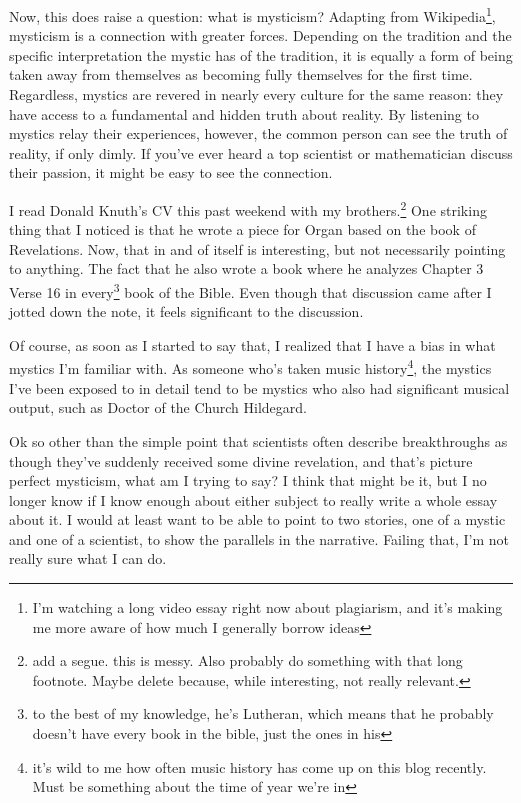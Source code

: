 \documentclass[12pt]{article}[titlepage]
\renewcommand{\,}{\textsuperscript{,}}
\begin{document}
Now, this does raise a question: what is mysticism?
Adapting from Wikipedia\footnote{I'm watching a long video essay right now about plagiarism, and it's making me more aware of how much I generally borrow ideas}, mysticism is a connection with greater forces.
Depending on the tradition and the specific interpretation the mystic has of the tradition, it is equally a form of being taken away from themselves as becoming fully themselves for the first time.
Regardless, mystics are revered in nearly every culture for the same reason: they have access to a fundamental and hidden truth about reality.
By listening to mystics relay their experiences, however, the common person can see the truth of reality, if only dimly.
If you've ever heard a top scientist or mathematician discuss their passion, it might be easy to see the connection.

I read Donald Knuth's CV this past weekend with my brothers.\footnote{add a segue. this is messy. Also probably do something with that long footnote. Maybe delete because, while interesting, not really relevant.}
One striking thing that I noticed is that he wrote a piece for Organ based on the book of Revelations.
Now, that in and of itself is interesting, but not necessarily pointing to anything.
The fact that he also wrote a book where he analyzes Chapter 3 Verse 16 in every\footnote{to the best of my knowledge, he's Lutheran, which means that he probably doesn't have every book in the bible, just the ones in his} book of the Bible.
Even though that discussion came after I jotted down the note, it feels significant to the discussion.

Of course, as soon as I started to say that, I realized that I have a bias in what mystics I'm familiar with.
As someone who's taken music history\footnote{it's wild to me how often music history has come up on this blog recently. Must be something about the time of year we're in}, the mystics I've been exposed to in detail tend to be mystics who also had significant musical output, such as Doctor of the Church Hildegard.

Ok so other than the simple point that scientists often describe breakthroughs as though they've suddenly received some divine revelation, and that's picture perfect mysticism, what am I trying to say?
I think that might be it, but I no longer know if I know enough about either subject to really write a whole essay about it.
I would at least want to be able to point to two stories, one of a mystic and one of a scientist, to show the parallels in the narrative.
Failing that, I'm not really sure what I can do.
\end{document}
